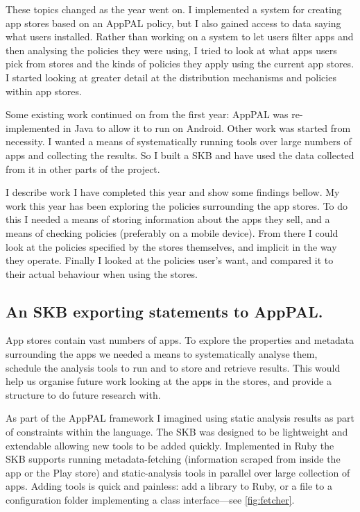 \documentclass[a4paper]{scrartcl}
\begin{document}
These topics changed as the year went on.
I implemented a system for creating app stores based on an AppPAL policy, but I also gained access to data saying what users installed.
Rather than working on a system to let users filter apps and then analysing the policies they were using, I tried to look at what apps users pick from stores and the kinds of policies they apply using the current app stores.
I started looking at greater detail at the distribution mechanisms and policies within app stores.

Some existing work continued on from the first year: AppPAL was re-implemented in Java to allow it to run on Android.
Other work was started from necessity.
I wanted a means of systematically running tools over large numbers of apps and collecting the results.
So I built a \ac{SKB}  and have used the data collected from it in other parts of the project.

I describe work I have completed this year and show some findings bellow.
My work this year has been exploring the policies surrounding the app stores.
To do this I needed a means of storing information about the apps they sell, and a means of checking policies (preferably on a mobile device).
From there I could look at the policies specified by the stores themselves, and implicit in the way they operate.
Finally I looked at the policies user's want, and compared it to their actual behaviour when using the stores.

\subsection{An \ac{SKB} exporting statements to AppPAL.}

App stores contain vast numbers of apps.
To explore the properties and metadata surrounding the apps we needed a means to systematically analyse them, schedule the analysis tools to run and to store and retrieve results.
This would help us organise future work looking at the apps in the stores, and provide a structure to do future research with.

As part of the AppPAL framework I imagined using static analysis results as part of constraints within the language.
The \ac{SKB} was designed to be lightweight and extendable allowing new tools to be added quickly.
Implemented in Ruby the \ac{SKB} supports running metadata-fetching (information scraped from inside the app or the Play store) and static-analysis tools in parallel over large collection of apps.
Adding tools is quick and painless: add a library to Ruby, or a file to a configuration folder implementing a class interface---see \autoref{fig:fetcher}.
\end{document}
